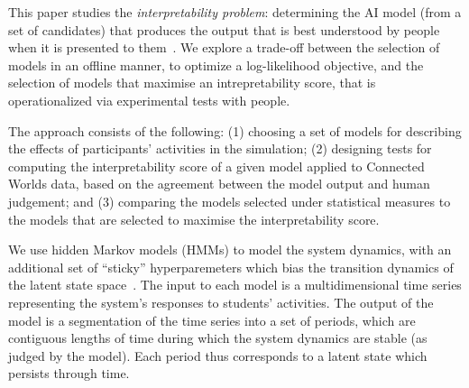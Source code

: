 \documentclass[letterpaper]{article} %
\newcommand{\kibitz}[2]{\ifnum\Comments=1{\textcolor{#1}{#2}}\fi}
\newcommand{\kg}[1]{\kibitz{red}{[KG:#1]}}
\begin{document}
This paper studies the \emph{interpretability problem}: determining the AI model (from a set of candidates) that produces the output that is  best understood by people when it is presented  to them~\cite{gilpin2018explaining,doshi2017roadmap,caruana2015intelligible}. 
We explore a trade-off between the selection of models in an offline manner, to optimize a log-likelihood objective, and the selection of models that maximise an intrepretability score, that is operationalized via experimental tests with people.

The approach consists of the following:
(1) choosing a set of models for describing the effects of participants' activities in the simulation; 
(2) designing tests for computing the interpretability score of a given model applied to Connected Worlds data, based on the agreement between the model output and human judgement; and 
(3) comparing the models selected under statistical measures to the models that are selected to maximise the interpretability score.


We use hidden Markov models (HMMs) to model the system dynamics, with an additional set of ``sticky'' hyperparemeters which bias the transition dynamics of the latent state space~\cite{fox2008hdp}. 
The input to each model is a multidimensional time series representing the system's responses to students' activities.
The output of the model is a segmentation of the time series into a set of periods, which are contiguous lengths of time during which the system 
dynamics are stable (as judged by the model). Each period thus corresponds to a latent state which persists through time.
\end{document}
